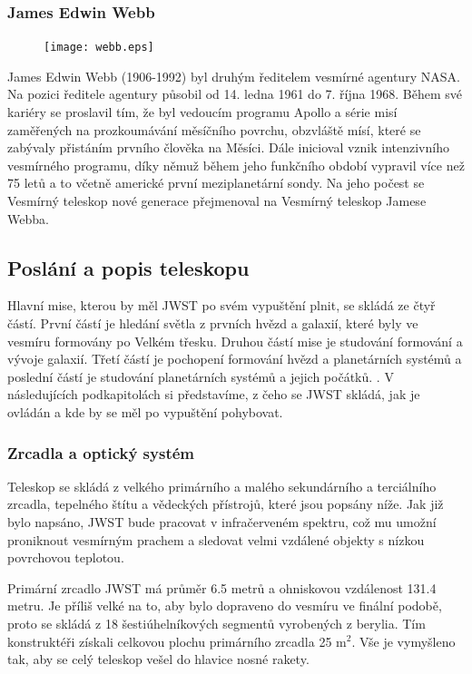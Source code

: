 \documentclass[a4paper,11pt]{article}
\begin{document}
\subsubsection{James Edwin Webb}
\begin{figure}
\texttt{[image: webb.eps]}
\end{figure}
James Edwin Webb (1906-1992) byl druhým ředitelem vesmírné agentury NASA. Na pozici ředitele agentury působil od 14. ledna 1961 do 7. října 1968. Během své kariéry se proslavil tím, že byl vedoucím programu Apollo a série misí zaměřených na prozkoumávání měsíčního povrchu, obzvláště mísí, které se zabývaly přistáním prvního člověka na Měsíci. 
Dále inicioval vznik intenzivního vesmírného programu, díky němuž během jeho funkčního období vypravil více než 75 letů a to včetně americké první meziplanetární sondy. Na jeho počest se Vesmírný teleskop nové generace přejmenoval na Vesmírný teleskop Jamese Webba.
\\

\subsection{Poslání a popis teleskopu}
Hlavní mise, kterou by měl JWST po svém vypuštění plnit, se skládá ze čtyř částí.  První částí je hledání světla z prvních hvězd a galaxií, které byly ve vesmíru formovány po Velkém třesku. Druhou částí mise je studování formování a vývoje galaxií. Třetí částí je pochopení formování hvězd a planetárních systémů a poslední částí je studování planetárních systémů a jejich počátků. \cite{wikipediaWebbEn}. V následujících podkapitolách si představíme, z čeho se JWST skládá, jak je ovládán a kde by se měl po vypuštění pohybovat.

\subsubsection{Zrcadla a optický systém}
Teleskop se skládá z velkého primárního a malého sekundárního a terciálního zrcadla, tepelného štítu a věde\-ckých přístrojů, které jsou popsány níže. Jak již bylo napsáno, JWST bude pracovat v infračerveném spektru, což mu umožní proniknout vesmírným prachem a sledovat velmi vzdálené objekty s nízkou povrchovou teplotou.

Primární zrcadlo JWST má průměr 6.5 metrů a ohniskovou vzdálenost 131.4 metru. Je příliš velké na to, aby bylo dopraveno do vesmíru ve finální podobě, proto se skládá z 18 šestiúhelníkových segmentů vyrobených z berylia. Tím konstruktéři získali celkovou plochu primárního zrcadla 25 m$^2$. Vše je vymyšleno tak, aby se celý teleskop vešel do hlavice nosné rakety.
\end{document}
